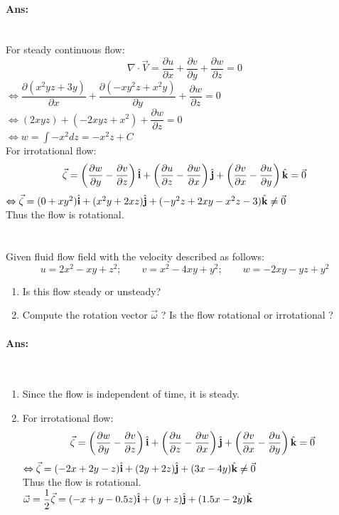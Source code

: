 \paragraph{Ans:}$  $\\
For steady continuous flow:
\[\nabla \cdot \vec{V}=\dfrac{\partial u}{\partial x} + \dfrac{\partial v}{\partial y} + \dfrac{\partial w}{\partial z}=0\]
$ \Leftrightarrow \dfrac{\partial (x^2yz+3y)}{\partial x} + \dfrac{\partial (-xy^2z+x^2y)}{\partial y} + \dfrac{\partial w}{\partial z} =0 $\\
$ \Leftrightarrow (2xyz) + (-2xyz+x^2) + \dfrac{\partial w}{\partial z} =0 $\\
$ \Leftrightarrow \displaystyle w = \int -x^2 dz = -x^2z + C $\\
For irrotational flow:
\[\vec{\zeta} = \left(\dfrac{\partial w}{\partial y} - \dfrac{\partial v}{\partial z}\right) \hat{\mathbf{i}} + \left(\dfrac{\partial u}{\partial z} - \dfrac{\partial w}{\partial x}\right) \hat{\mathbf{j}} + \left(\dfrac{\partial v}{\partial x} - \dfrac{\partial u}{\partial y}\right) \hat{\mathbf{k}} =\vec{0}\]
$ \Leftrightarrow \vec{\zeta}= (0+xy^2)\hat{\mathbf{i}} + (x^2y+2xz)\hat{\mathbf{j}} + (-y^2z+2xy-x^2z-3)\hat{\mathbf{k}}  \neq \vec{0}$\\
Thus the flow is rotational.

\section{}
Given fluid flow field with the velocity described as follows:
\[u=2x^2-xy+z^2;\qquad v =x^2-4xy+y^2; \qquad w=-2xy-yz+y^2\]
\begin{enumerate}
	\item Is this flow steady or unsteady?
	\item Compute the rotation vector $ \vec{\omega} $ ? Is the flow rotational or irrotational ?
\end{enumerate}
\paragraph{Ans:}$ $
\begin{enumerate}
	\item Since the flow is independent of time, it is steady.
	\item For irrotational flow:
	\[\vec{\zeta} = \left(\dfrac{\partial w}{\partial y} - \dfrac{\partial v}{\partial z}\right) \hat{\mathbf{i}} + \left(\dfrac{\partial u}{\partial z} - \dfrac{\partial w}{\partial x}\right) \hat{\mathbf{j}} + \left(\dfrac{\partial v}{\partial x} - \dfrac{\partial u}{\partial y}\right) \hat{\mathbf{k}} =\vec{0}\]
	$ \Leftrightarrow \vec{\zeta} = (-2x+2y-z)\hat{\mathbf{i}} + (2y+2z)\hat{\mathbf{j}} + (3x-4y)\hat{\mathbf{k}}  \neq \vec{0} $\\
	Thus the flow is rotational.\\
	$ \vec{\omega} = \dfrac{1}{2}\vec{\zeta} = (-x+y-0.5z)\hat{\mathbf{i}} + (y+z)\hat{\mathbf{j}} + (1.5x-2y)\hat{\mathbf{k}} $	
\end{enumerate}


